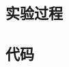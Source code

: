 \documentclass{../../../../Cls/SDU/ExpReport/Robot/Robot}
\begin{document}
\begin{sduDocument}
\section{实验过程}
\subsection{代码}

\end{sduDocument}
\end{document}
